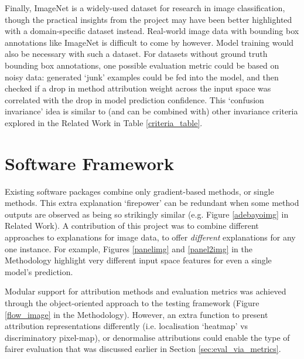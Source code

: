 \documentclass[main]{subfiles}
\begin{document}
Finally, ImageNet is a widely-used dataset for research in image classification, though the practical insights from the project may have been better highlighted with a domain-specific dataset instead. Real-world image data with bounding box annotations like ImageNet is difficult to come by however. Model training would also be necessary with such a dataset. For datasets without ground truth bounding box annotations, one possible evaluation metric could be based on noisy data: generated `junk' examples could be fed into the model, and then checked if a drop in method attribution weight across the input space was correlated with the drop in model prediction confidence. This `confusion invariance' idea is similar to (and can be combined with) other invariance criteria explored in the Related Work in Table \ref{criteria_table}.



\section{Software Framework}

Existing software packages combine only gradient-based methods, or single methods. This extra explanation `firepower' can be redundant when some method outputs are observed as being so strikingly similar (e.g. Figure \ref{adebayoimg} in Related Work). A contribution of this project was to combine different approaches to explanations for image data, to offer \textit{different} explanations for any one instance. For example, Figures \ref{panelimg} and \ref{panel2img} in the Methodology highlight very different input space features for even a single model's prediction.

Modular support for attribution methods and evaluation metrics was achieved through the object-oriented approach to the testing framework (Figure \ref{flow_image} in the Methodology). However, an extra function to present attribution representations differently (i.e. localisation `heatmap' vs discriminatory pixel-map), or denormalise attributions could enable the type of fairer evaluation that was discussed earlier in Section \ref{sec:eval_via_metrics}.
\end{document}
